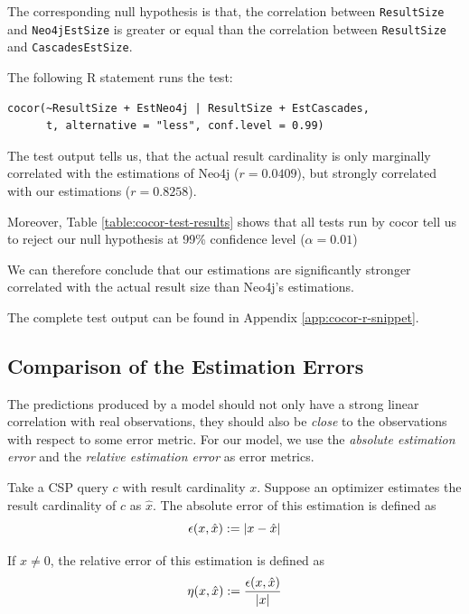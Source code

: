 The corresponding null hypothesis is that, the correlation between
\texttt{ResultSize} and \texttt{Neo4jEstSize} is greater or equal than
the correlation between
\texttt{ResultSize} and \texttt{CascadesEstSize}.

The following R statement runs the test:
\begin{verbatim}
cocor(~ResultSize + EstNeo4j | ResultSize + EstCascades,
      t, alternative = "less", conf.level = 0.99)
\end{verbatim}

The test output tells us, that the actual result cardinality
is only marginally correlated with the estimations of Neo4j ($r = 0.0409$),
but strongly correlated with our estimations ($r = 0.8258$).

Moreover, Table \ref{table:cocor-test-results} shows that all tests run by
cocor tell us to reject our null hypothesis at 99\% confidence level
($\alpha = 0.01$)%



We can therefore conclude that our estimations are
significantly stronger correlated with the actual result size than Neo4j's
estimations.

The complete test output can be found in Appendix \ref{app:cocor-r-snippet}.

\subsection{Comparison of the Estimation Errors}
\label{sec:estimations-errors}

The predictions produced by a model should not only have a strong linear
correlation with real observations, they should also be \emph{close} to the
observations with respect to some error metric.
For our model, we use the \emph{absolute estimation error} and the
\emph{relative estimation error} as error metrics.

\begin{definition}
Take a CSP query $c$ with result cardinality $x$.
Suppose an optimizer estimates the result cardinality of $c$ as $\hat{x}$.
The absolute error of this estimation is defined as
\[
  \epsilon(x, \hat{x}) := | x - \hat{x} |
\]

If $x \not = 0$, the relative error of this estimation is defined as
\[
  \eta(x, \hat{x}) := \frac{\epsilon(x, \hat{x})}{| x |}
\]
\end{definition}

